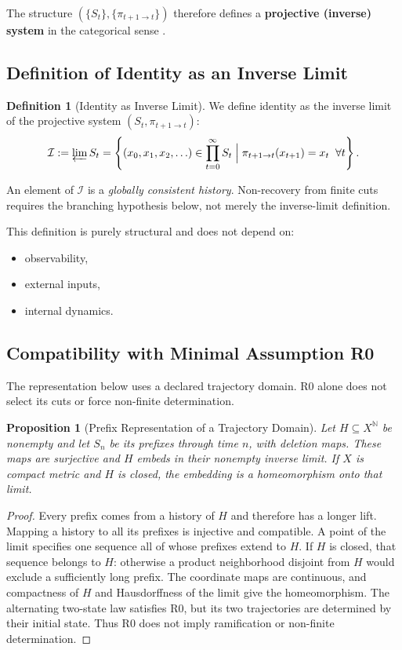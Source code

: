 \documentclass[11pt,a4paper]{article}
\theoremstyle{plain}
\newtheorem{proposition}[theorem]{Proposition}
\theoremstyle{definition}
\newtheorem{definition}[theorem]{Definition}
\theoremstyle{remark}
\begin{document}
The structure $(\{S_t\}, \{\pi_{t+1 \to t}\})$ therefore defines a \textbf{projective (inverse) system} in the categorical sense \cite{maclane1998, adamek1990}.

\subsection{Definition of Identity as an Inverse Limit}

\begin{definition}[Identity as Inverse Limit]
We define identity as the inverse limit of the projective system $(S_t, \pi_{t+1 \to t})$:
\begin{equation}
    \mathcal{I} := \varprojlim S_t = \left\{ (x_0, x_1, x_2, \ldots) \in \prod_{t=0}^{\infty} S_t \;\Big|\; \pi_{t+1 \to t}(x_{t+1}) = x_t \;\; \forall t \right\}.
\end{equation}
\end{definition}

An element of $\mathcal{I}$ is a \textit{globally consistent history}. Non-recovery from finite cuts requires the branching hypothesis below, not merely the inverse-limit definition.

This definition is purely structural and does not depend on:
\begin{itemize}[leftmargin=*]
    \item observability,
    \item external inputs,
    \item internal dynamics.
\end{itemize}

\subsection{Compatibility with Minimal Assumption R0}

The representation below uses a declared trajectory domain. R0 alone does not select its cuts or force non-finite determination.

\begin{proposition}[Prefix Representation of a Trajectory Domain]\label{prop:necessity}
Let $H\subseteq X^{\mathbb N}$ be nonempty and let $S_n$ be its prefixes through time $n$, with deletion maps. These maps are surjective and $H$ embeds in their nonempty inverse limit. If $X$ is compact metric and $H$ is closed, the embedding is a homeomorphism onto that limit.
\end{proposition}
\begin{proof}
Every prefix comes from a history of $H$ and therefore has a longer lift. Mapping a history to all its prefixes is injective and compatible. A point of the limit specifies one sequence all of whose prefixes extend to $H$. If $H$ is closed, that sequence belongs to $H$: otherwise a product neighborhood disjoint from $H$ would exclude a sufficiently long prefix. The coordinate maps are continuous, and compactness of $H$ and Hausdorffness of the limit give the homeomorphism. The alternating two-state law satisfies R0, but its two trajectories are determined by their initial state. Thus R0 does not imply ramification or non-finite determination.
\end{proof}
\end{document}
